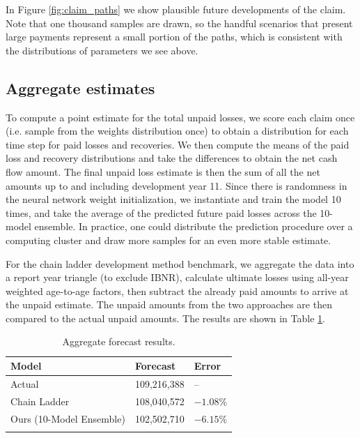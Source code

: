 \documentclass{article}
\begin{document}
In Figure \ref{fig:claim_paths} we show plausible future developments of the
claim. Note that one thousand samples are drawn, so the handful scenarios that
present large payments represent a small portion of the paths, which is 
consistent with the distributions of parameters we see above.

\subsection{Aggregate estimates}

To compute a point estimate for the total unpaid losses, we score each claim 
once (i.e. sample from the weights distribution once) to obtain a distribution 
for each time step for paid losses and recoveries. We then compute the means of
the paid loss and recovery distributions and take the differences to obtain the 
net cash flow amount. The final unpaid loss estimate is then the sum of all the 
net amounts up to and including development year 11. Since there is randomness 
in the neural network weight initialization, we instantiate and train the model
10 times, and take the average of the predicted future paid losses across the 
10-model ensemble. In practice, one could distribute the prediction procedure 
over a computing cluster and draw more samples for an even more stable estimate.

For the chain ladder development method benchmark, we aggregate the data into a 
report year triangle (to exclude IBNR), calculate ultimate losses using all-year
weighted age-to-age factors, then subtract the already paid amounts to arrive at
the unpaid estimate. The unpaid amounts from the two approaches are then 
compared to the actual unpaid amounts. The results are shown in Table
\ref{table:results}.

\begin{table}[ht]
\centering
\begin{tabular}[t]{lll}
\toprule
Model & Forecast & Error\\
\midrule
Actual                                & 109,216,388  & --\\
Chain Ladder                          & 108,040,572  & $-1.08\%$\\
Ours (10-Model Ensemble)              & 102,502,710  & $-6.15\%$\\
\bottomrule\\[1ex]
\end{tabular}
\caption{Aggregate forecast results.}
\label{table:results}
\end{table}%
\end{document}
